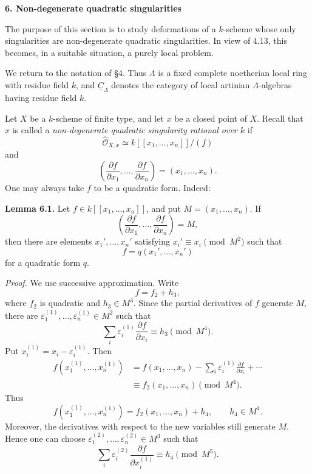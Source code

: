 \par\bigskip
\noindent\textbf{6. Non-degenerate quadratic singularities}

\medskip
The purpose of this section is to study deformations of a $k$-scheme
whose only singularities are non-degenerate quadratic singularities.
In view of 4.13, this becomes, in a suitable situation, a purely local
problem.

We return to the notation of \S4. Thus $\Lambda$ is a fixed complete
noetherian local ring with residue field $k$, and
$\underline C_\Lambda$ denotes the category of local artinian
$\Lambda$-algebras having residue field $k$.

Let $X$ be a $k$-scheme of finite type, and let $x$ be a closed point
of $X$. Recall that $x$ is called a \emph{non-degenerate quadratic
singularity rational over $k$} if
\[
\widehat{\mathcal O}_{X,x}
 \simeq k[[x_1,\ldots,x_n]]/(f)
\]
and
\[
\left(\frac{\partial f}{\partial x_1},\ldots,
      \frac{\partial f}{\partial x_n}\right)
=(x_1,\ldots,x_n).
\]
One may always take $f$ to be a quadratic form. Indeed:

\medskip
\noindent\textbf{Lemma 6.1.}
Let $f\in k[[x_1,\ldots,x_n]]$, and put
$M=(x_1,\ldots,x_n)$. If
\[
\left(\frac{\partial f}{\partial x_1},\ldots,
      \frac{\partial f}{\partial x_n}\right)=M,
\]
then there are elements $x_1',\ldots,x_n'$ satisfying
$x_i'\equiv x_i\pmod{M^2}$ such that
\[
f=q(x_1',\ldots,x_n')
\]
for a quadratic form $q$.

\smallskip
\noindent\textit{Proof.}
We use successive approximation. Write
\[
f=f_2+h_3,
\]
where $f_2$ is quadratic and $h_3\in M^3$. Since the partial
derivatives of $f$ generate $M$, there are
$\varepsilon_1^{(1)},\ldots,\varepsilon_n^{(1)}\in M^2$ such that
\[
\sum_i\varepsilon_i^{(1)}\frac{\partial f}{\partial x_i}
 \equiv h_3\pmod{M^4}.
\]
Put $x_i^{(1)}=x_i-\varepsilon_i^{(1)}$. Then
\[
\begin{aligned}
f(x_1^{(1)},\ldots,x_n^{(1)})
&=f(x_1,\ldots,x_n)
 -\sum_i\varepsilon_i^{(1)}\frac{\partial f}{\partial x_i}
 +\cdots\\
&\equiv f_2(x_1,\ldots,x_n)\pmod{M^4}.
\end{aligned}
\]
Thus
\[
f(x_1^{(1)},\ldots,x_n^{(1)})
=f_2(x_1,\ldots,x_n)+h_4,
\qquad h_4\in M^4.
\]
Moreover, the derivatives with respect to the new variables still
generate $M$. Hence one can choose
$\varepsilon_1^{(2)},\ldots,\varepsilon_n^{(2)}\in M^3$ such that
\[
\sum_i\varepsilon_i^{(2)}
 \frac{\partial f}{\partial x_i^{(1)}}
 \equiv h_4\pmod{M^5}.
\]

